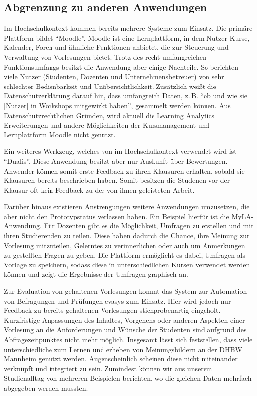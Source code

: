 \subsection{Abgrenzung zu anderen Anwendungen}
Im Hochschulkontext kommen bereits mehrere Systeme zum Einsatz.
Die primäre Plattform bildet \enquote{Moodle}.
Moodle ist eine Lernplattform, in dem Nutzer Kurse, Kalender, Foren und ähnliche Funktionen anbietet, die zur Steuerung und Verwaltung von Vorlesungen bietet.
Trotz des recht umfangreichen Funktionsumfangs besitzt die Anwendung aber einige Nachteile.
So berichten viele Nutzer (Studenten, Dozenten und Unternehmensbetreuer) von sehr schlechter Bedienbarkeit und Unübersichtlichkeit.
Zusätzlich weißt die Datenschutzerklärung darauf hin, dass umfangreich Daten, z.\,B. \enquote{ob und wie sie [Nutzer] in Workshops mitgewirkt haben}, gesammelt werden können.\autocites{moodleTermsOfServiceDHBW}{moodleTermsOfService}
Aus Datenschutzrechtlichen Gründen, wird aktuell die Learning Analytics Erweiterungen und andere Möglichkeiten der Kursmanagement und Lernplattform Moodle nicht genutzt.

Ein weiteres Werkzeug, welches von im Hochschulkontext verwendet wird ist \enquote{Dualis}.
Diese Anwendung besitzt aber nur Auskunft über Bewertungen.
Anwender können somit erste Feedback zu ihren Klausuren erhalten, sobald sie Klausuren bereits beschrieben haben.
Somit besitzen die Studenen vor der Klausur oft kein Feedback zu der von ihnen geleisteten Arbeit.

Darüber hinaus existieren Anstrengungen weitere Anwendungen umzusetzen, die aber nicht den Prototypstatus verlassen haben.
Ein Beispiel hierfür ist die MyLA-Anwendung.\autocite{mylaGithub}
Für Dozenten gibt es die Möglichkeit, Umfragen zu erstellen und mit ihren Studierenden zu teilen. Diese haben dadurch die Chance, ihre Meinung zur Vorlesung mitzuteilen, Gelerntes zu verinnerlichen oder auch um Anmerkungen zu gestellten Fragen zu geben. Die Plattform ermöglicht es dabei, Umfragen als Vorlage zu speichern, sodass diese in unterschiedlichen Kursen verwendet werden können und zeigt die Ergebnisse der Umfragen graphisch an.

Zur Evaluation von gehaltenen Vorlesungen kommt das System zur Automation von Befragungen und Prüfungen evasys zum Einsatz. \autocite{evasys} Hier wird jedoch nur Feedback zu bereits gehaltenen Vorlesungen stichprobenartig eingeholt. Kurzfristige Anpassungen des Inhaltes, Vorgehens oder anderen Aspekten einer Vorlesung an die Anforderungen und Wünsche der Studenten sind aufgrund des Abfragezeitpunktes nicht mehr möglich. Insgesamt lässt sich feststellen, dass viele unterschiedliche zum Lernen und erheben von Meinungsbildern an der DHBW Mannheim genutzt werden. Augenscheinlich scheinen diese nicht miteinander verknüpft und integriert zu sein. Zumindest können wir aus unserem Studienalltag von mehreren Beispielen berichten, wo die gleichen Daten mehrfach abgegeben werden mussten.

